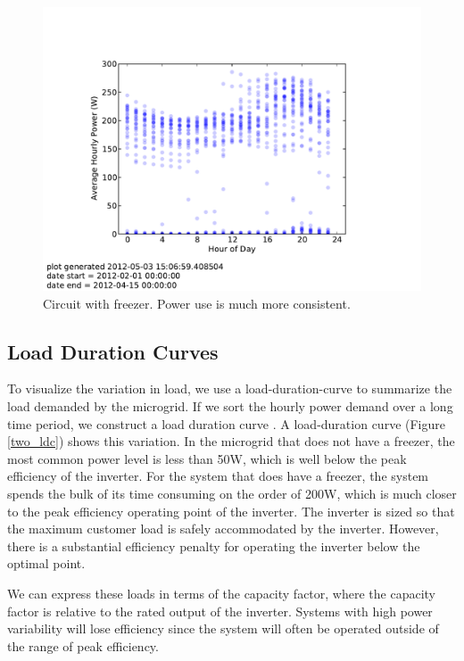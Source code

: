 \documentclass[conference]{IEEEtran}
\begin{document}
\begin{figure}[]
\begin{center}
\includegraphics[trim = 0.7in 0.8in 0.7in 1.1in, clip, width=\columnwidth]{figures/freezer_profile.pdf}
\end{center}
\caption{Circuit with freezer.  
Power use is much more consistent.}
\label{freezer}
\end{figure}

\subsection{Load Duration Curves}

To visualize the variation in load, we use a load-duration-curve
to summarize the load demanded by the microgrid.
If we sort the hourly power demand over a long time period, we
construct a load duration curve \cite{REEPS}.
A load-duration curve (Figure \ref{two_ldc}) shows this variation.
In the microgrid that does not have a freezer, the most common
power level is less than 50W, which is well below the peak
efficiency of the inverter.
For the system that does have a freezer, the system spends the bulk
of its time consuming on the order of 200W, which is much closer
to the peak efficiency operating point of the inverter.
The inverter is sized so that the maximum customer load is safely
accommodated by the inverter.
However, there is a substantial efficiency penalty for operating the
inverter below the optimal point.

We can express these loads in terms of the capacity factor,
where the capacity factor is relative to the rated output
of the inverter.
Systems with high power variability will lose efficiency since
the system will often be operated outside of the range of
peak efficiency.
\end{document}
